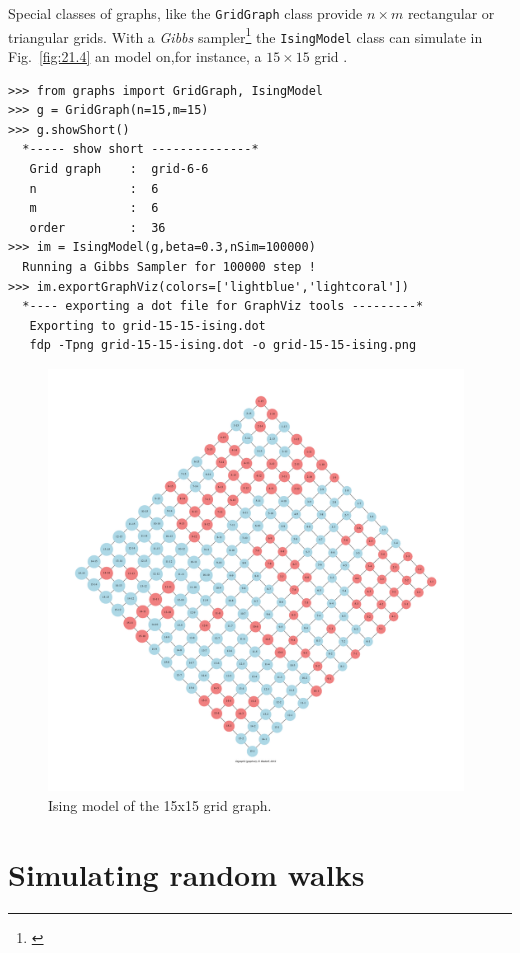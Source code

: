 Special classes of graphs, like the \texttt{GridGraph} class provide $n \times m$ rectangular or triangular grids. With a \emph{Gibbs} sampler\footnote{\citet{GEM-1984}} the \texttt{IsingModel} class can simulate in Fig.~\vref{fig:21.4} an \Ising model on,for instance, a $15 \times 15$ grid \citep{ISI-1925}.
\begin{lstlisting}[caption={Simulating an Ising model on a the $15 \times 15$ rectangular grid},label=list:21.11]
>>> from graphs import GridGraph, IsingModel
>>> g = GridGraph(n=15,m=15)
>>> g.showShort()
  *----- show short --------------*
   Grid graph    :  grid-6-6
   n             :  6
   m             :  6
   order         :  36
>>> im = IsingModel(g,beta=0.3,nSim=100000)
  Running a Gibbs Sampler for 100000 step !
>>> im.exportGraphViz(colors=['lightblue','lightcoral'])
  *---- exporting a dot file for GraphViz tools ---------*
   Exporting to grid-15-15-ising.dot
   fdp -Tpng grid-15-15-ising.dot -o grid-15-15-ising.png
\end{lstlisting}
\begin{figure}[h]
\sidecaption
\includegraphics[width=11cm]{Figures/21-4-grid-15-15-ising.pdf}
\caption{Ising model of the 15x15 grid graph.} 
\label{fig:21.4}       %
\end{figure}

\section{Simulating \Metropolis random walks}
\label{sec:21.6}

